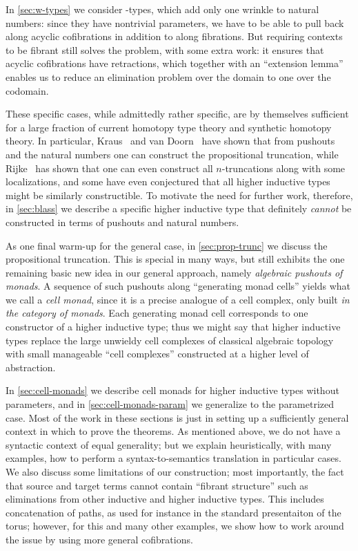\documentclass{amsart}
\let\W\iW
\begin{document}
In \cref{sec:w-types} we consider \W-types, which add only one wrinkle to natural numbers: since they have nontrivial parameters, we have to be able to pull back along acyclic cofibrations in addition to along fibrations.
But requiring contexts to be fibrant still solves the problem, with some extra work: it ensures that acyclic cofibrations have retractions, which together with an ``extension lemma'' enables us to reduce an elimination problem over the domain to one over the codomain.

These specific cases, while admittedly rather specific, are by themselves sufficient for a large fraction of current homotopy type theory and synthetic homotopy theory.
In particular, Kraus~\cite{kraus:nonrec-hit} and van Doorn~\cite{vandoorn:proptrunc-nonrec} have shown that from pushouts and the natural numbers one can construct the propositional truncation, while Rijke~\cite{rijke:join,rijke:omegaloc-talk} has shown that one can even construct all $n$-truncations along with some localizations, and some have even conjectured that all higher inductive types might be similarly constructible.
To motivate the need for further work, therefore, in \cref{sec:blass} we describe a specific higher inductive type that definitely \emph{cannot} be constructed in terms of pushouts and natural numbers.

As one final warm-up for the general case, in \cref{sec:prop-trunc} we discuss the propositional truncation.
This is special in many ways, but still exhibits the one remaining basic new idea in our general approach, namely \emph{algebraic pushouts of monads}.
A sequence of such pushouts along ``generating monad cells'' yields what we call a \emph{cell monad}, since it is a precise analogue of a cell complex, only built \emph{in the category of monads}.
Each generating monad cell corresponds to one constructor of a higher inductive type; thus we might say that higher inductive types replace the large unwieldy cell complexes of classical algebraic topology with small manageable ``cell complexes'' constructed at a higher level of abstraction.

In \cref{sec:cell-monads} we describe cell monads for higher inductive types without parameters, and in \cref{sec:cell-monads-param} we generalize to the parametrized case.
Most of the work in these sections is just in setting up a sufficiently general context in which to prove the theorems.
As mentioned above, we do not have a syntactic context of equal generality; but we explain heuristically, with many examples, how to perform a syntax-to-semantics translation in particular cases.
We also discuss some limitations of our construction; most importantly, the fact that source and target terms cannot contain ``fibrant structure'' such as eliminations from other inductive and higher inductive types.
This includes concatenation of paths, as used for instance in the standard presentaiton of the torus; however, for this and many other examples, we show how to work around the issue by using more general cofibrations.
\end{document}
